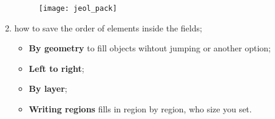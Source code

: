 \begin{enumerate}
  \begin{figure}[h]
    \centering \texttt{[image: jeol\_pack]}
  \end{figure}

  \noindent
\item  {}  how  to  save the  order  of
  elements inside the fields;

  \begin{framed}\noindent
     \ira
    \begin{itemize}
    \item  \textbf{By geometry}  to fill  objects wihtout  jumping or
      another option;
    \item \textbf{Left to right};
    \item \textbf{By layer};
    \item  \textbf{Writing regions}  fills in  region by  region, who
      size you set.
    \end{itemize}
  \end{framed}
\end{enumerate}

